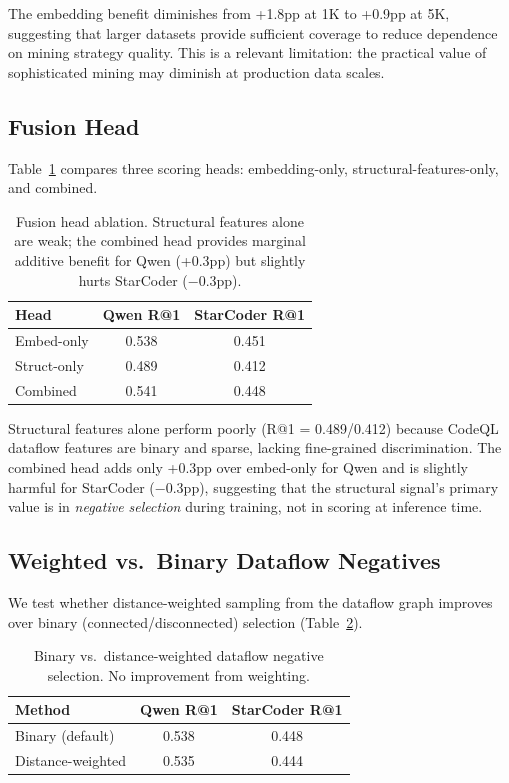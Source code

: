 \documentclass[11pt,a4paper]{article}
\begin{document}
The embedding benefit diminishes from +1.8pp at 1K to +0.9pp at 5K, suggesting that larger datasets provide sufficient coverage to reduce dependence on mining strategy quality. This is a relevant limitation: the practical value of sophisticated mining may diminish at production data scales.

\subsection{Fusion Head}
\label{sec:fusion}

Table~\ref{tab:fusion} compares three scoring heads: embedding-only, structural-features-only, and combined.

\begin{table}[t]
\centering
\small
\begin{tabular}{lcc}
\toprule
\textbf{Head} & \textbf{Qwen R@1} & \textbf{StarCoder R@1} \\
\midrule
Embed-only & 0.538 & 0.451 \\
Struct-only & 0.489 & 0.412 \\
Combined & 0.541 & 0.448 \\
\bottomrule
\end{tabular}
\caption{Fusion head ablation. Structural features alone are weak; the combined head provides marginal additive benefit for Qwen (+0.3pp) but slightly hurts StarCoder ($-$0.3pp).}
\label{tab:fusion}
\end{table}

Structural features alone perform poorly (R@1 = 0.489/0.412) because CodeQL dataflow features are binary and sparse, lacking fine-grained discrimination. The combined head adds only +0.3pp over embed-only for Qwen and is slightly harmful for StarCoder ($-$0.3pp), suggesting that the structural signal's primary value is in \emph{negative selection} during training, not in scoring at inference time.

\subsection{Weighted vs.\ Binary Dataflow Negatives}
\label{sec:weighted}

We test whether distance-weighted sampling from the dataflow graph improves over binary (connected/disconnected) selection (Table~\ref{tab:weighted}).

\begin{table}[t]
\centering
\small
\begin{tabular}{lcc}
\toprule
\textbf{Method} & \textbf{Qwen R@1} & \textbf{StarCoder R@1} \\
\midrule
Binary (default) & 0.538 & 0.448 \\
Distance-weighted & 0.535 & 0.444 \\
\bottomrule
\end{tabular}
\caption{Binary vs.\ distance-weighted dataflow negative selection. No improvement from weighting.}
\label{tab:weighted}
\end{table}
\end{document}
